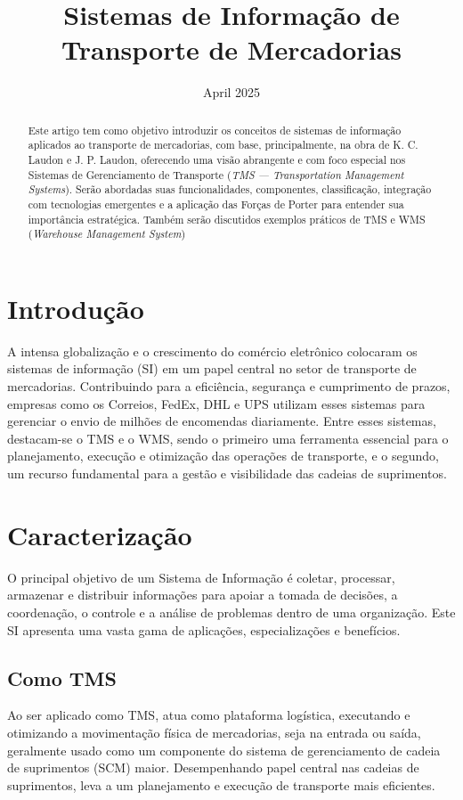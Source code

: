 \documentclass[conference]{IEEEtran}
\title{Sistemas de Informação de Transporte de Mercadorias}
\author{
\IEEEauthorblockN{Pedro Henrique L.B.T Bomfim, Robson França, Igor Nascimento}
\IEEEauthorblockA{\textit{Universidade de São Paulo}}
}
\date{April 2025}
\begin{document}
\maketitle

\begin{abstract}
Este artigo tem como objetivo introduzir os conceitos de sistemas de informação aplicados ao transporte de mercadorias, com base, principalmente, na obra de K. C. Laudon e J. P. Laudon\cite{laudon2015}, oferecendo uma visão abrangente e com foco especial nos Sistemas de Gerenciamento de Transporte (\textit{TMS — Transportation Management Systems}). Serão abordadas suas funcionalidades, componentes, classificação, integração com tecnologias emergentes e a aplicação das Forças de Porter para entender sua importância estratégica. Também serão discutidos exemplos práticos de TMS e WMS (\textit{Warehouse Management System})

\end{abstract}

\section{Introdução}
A intensa globalização e o crescimento do comércio eletrônico colocaram os sistemas de informação (SI) em um papel central no setor de transporte de mercadorias. Contribuindo para a eficiência, segurança e cumprimento de prazos, empresas como os Correios, FedEx, DHL e UPS utilizam esses sistemas para gerenciar o envio de milhões de encomendas diariamente. Entre esses sistemas, destacam-se o TMS e o WMS, sendo o primeiro uma ferramenta essencial para o planejamento, execução e otimização das operações de transporte, e o segundo, um recurso fundamental para a gestão e visibilidade das cadeias de suprimentos.

\section{Caracterização}
O principal objetivo de um Sistema de Informação é coletar, processar, armazenar e distribuir informações para apoiar a tomada de decisões, a coordenação, o controle e a análise de problemas dentro de uma organização. Este SI apresenta uma vasta gama de aplicações, especializações e benefícios.
\subsection{Como TMS}
Ao ser aplicado como TMS, atua como plataforma logística, executando e otimizando a movimentação física de mercadorias, seja na entrada ou saída, geralmente usado como um componente do sistema de gerenciamento de cadeia de suprimentos (SCM) maior. Desempenhando papel central nas cadeias de suprimentos, leva a um planejamento e execução de transporte mais eficientes.
\end{document}
